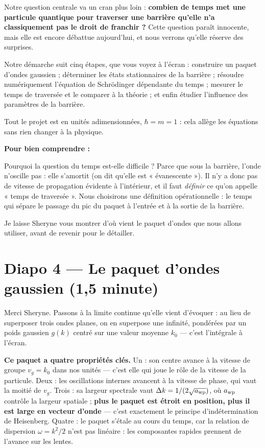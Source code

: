 \documentclass[11pt,a4paper]{article}
\newcommand{\diapo}[2]{\section*{Diapo #1 --- #2}}
\newenvironment{comprendre}%
{\par\medskip\noindent\hrulefill\par\nopagebreak\textbf{Pour bien comprendre :}\itshape\par}%
{\par\nopagebreak\noindent\hrulefill\par\medskip}
\begin{document}
	Notre question centrale va un cran plus loin : \textbf{combien de temps met une
		particule quantique pour traverser une barrière qu'elle n'a classiquement pas le
		droit de franchir ?} Cette question paraît innocente, mais elle est encore
	débattue aujourd'hui, et nous verrons qu'elle réserve des surprises.
	
	Notre démarche suit cinq étapes, que vous voyez à l'écran : construire un paquet
	d'ondes gaussien ; déterminer les états stationnaires de la barrière ; résoudre
	numériquement l'équation de Schrödinger dépendante du temps ; mesurer le temps de
	traversée et le comparer à la théorie ; et enfin étudier l'influence des
	paramètres de la barrière.
	
	Tout le projet est en unités adimensionnées, $\hbar = m = 1$ : cela allège les
	équations sans rien changer à la physique.
	
	\begin{comprendre}
		Pourquoi la question du temps est-elle difficile ? Parce que sous la barrière,
		l'onde n'oscille pas : elle s'amortit (on dit qu'elle est « évanescente »). Il
		n'y a donc pas de vitesse de propagation évidente à l'intérieur, et il faut
		\emph{définir} ce qu'on appelle « temps de traversée ». Nous choisirons une
		définition opérationnelle : le temps qui sépare le passage du pic du paquet à
		l'entrée et à la sortie de la barrière.
	\end{comprendre}
	
	Je laisse Sheryne vous montrer d'où vient le paquet d'ondes que nous allons
	utiliser, avant de revenir pour le détailler.
	
	\diapo{4}{Le paquet d'ondes gaussien (1,5 minute)}
	
	Merci Sheryne. Passons à la limite continue qu'elle vient d'évoquer : au lieu
	de superposer trois ondes planes, on en superpose une infinité, pondérées par
	un poids gaussien $g(k)$ centré sur une valeur moyenne $k_0$ --- c'est
	l'intégrale à l'écran.
	
	\textbf{Ce paquet a quatre propriétés clés.} Un : son centre avance à la vitesse
	de groupe $v_g = k_0$ dans nos unités --- c'est elle qui joue le rôle de la
	vitesse de la particule. Deux : les oscillations internes avancent à la vitesse
	de phase, qui vaut la moitié de $v_g$. Trois : sa largeur spectrale vaut
	$\Delta k = 1/(2\sqrt{a_{\rm wp}})$, où $a_{\rm wp}$ contrôle la largeur
	spatiale ; \textbf{plus le paquet est étroit en position, plus il est large en
		vecteur d'onde} --- c'est exactement le principe d'indétermination de Heisenberg.
	Quatre : le paquet s'étale au cours du temps, car la relation de dispersion
	$\omega = k^2/2$ n'est pas linéaire : les composantes rapides prennent de
	l'avance sur les lentes.
	
\end{document}
